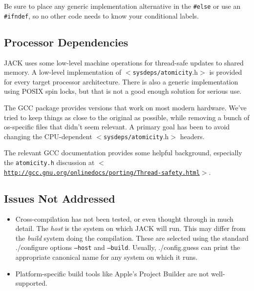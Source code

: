 Be sure to place any generic implementation alternative in the {\tt \#else} or use an {\tt \#ifndef}, so no other code needs to know your conditional labels.\hypertarget{porting-guide_portcpu}{}\subsection{Processor Dependencies}\label{porting-guide_portcpu}
JACK uses some low-level machine operations for thread-safe updates to shared memory. A low-level implementation of {\tt $<$sysdeps/atomicity}.h$>$ is provided for every target processor architecture. There is also a generic implementation using POSIX spin locks, but that is not a good enough solution for serious use.

The GCC package provides versions that work on most modern hardware. We've tried to keep things as close to the original as possible, while removing a bunch of os-specific files that didn't seem relevant. A primary goal has been to avoid changing the CPU-dependent {\tt $<$sysdeps/atomicity}.h$>$ headers.

The relevant GCC documentation provides some helpful background, especially the {\tt atomicity.h} discussion at $<$\href{http://gcc.gnu.org/onlinedocs/porting/Thread-safety.html}{\tt http://gcc.gnu.org/onlinedocs/porting/Thread-safety.html}$>$.\hypertarget{porting-guide_portissues}{}\subsection{Issues Not Addressed}\label{porting-guide_portissues}
\begin{itemize}
\item Cross-compilation has not been tested, or even thought through in much detail. The {\em host\/} is the system on which JACK will run. This may differ from the {\em build\/} system doing the compilation. These are selected using the standard {\tt }./configure options {\tt --host} and {\tt --build}. Usually, {\tt }./config.guess can print the appropriate canonical name for any system on which it runs.\end{itemize}


\begin{itemize}
\item Platform-specific build tools like Apple's Project Builder are not well-supported. \end{itemize}
